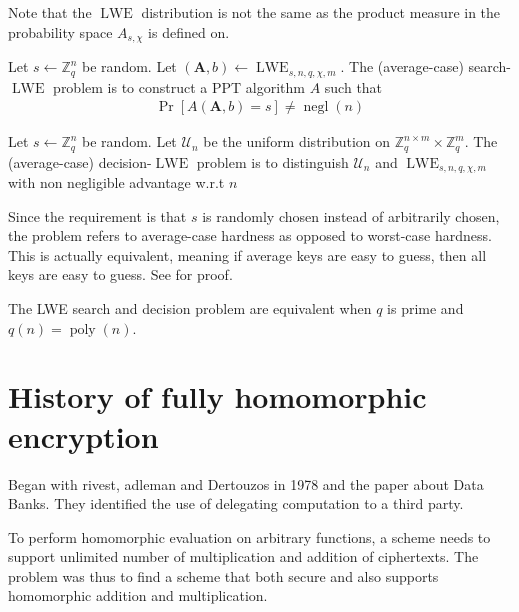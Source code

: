 Note that the $\operatorname{LWE}$ distribution is not the same as the product measure in the probability space $A_{s,\chi}$ is defined on.
\begin{definition}
    Let $s \leftarrow \mathbb{Z}_q^n$ be random.
    Let $(\textbf{A}, b) \leftarrow \operatorname{LWE}_{s, n, q, \chi, m}$. The (average-case) search-$\operatorname{LWE}$ problem is to construct a PPT algorithm $A$ such that
    \begin{equation}
        \begin{aligned}
            \operatorname{Pr}[A(\textbf{A}, b) = s] \neq \operatorname{negl}(n)
        \end{aligned}
    \end{equation}
\end{definition}
\begin{definition}
    Let $s \leftarrow \mathbb{Z}_q^n$ be random.
    Let $\mathcal{U}_n$ be the uniform distribution on $\mathbb{Z}_q^{n \times m} \times \mathbb{Z}_q^m$. The (average-case) decision-$\operatorname{LWE}$ problem is to distinguish $\mathcal{U}_n$ and $\operatorname{LWE}_{s, n, q, \chi, m}$ with non negligible advantage w.r.t $n$
\end{definition}
\begin{remark}
    Since the requirement is that $s$ is randomly chosen instead of arbitrarily chosen, the problem refers to average-case hardness as opposed to worst-case hardness. This is actually equivalent, meaning if average keys are easy to guess, then all keys are easy to guess. See \cite{Reg10} for proof.
\end{remark}
The LWE search and decision problem are equivalent when $q$ is prime and $q(n) = \operatorname{poly}(n)$.

\section{History of fully homomorphic encryption}
Began with rivest, adleman and Dertouzos in 1978 and the paper about Data Banks. 
They identified the use of delegating computation to a third party.

To perform homomorphic evaluation on arbitrary functions, a scheme needs to support unlimited number of multiplication and addition of ciphertexts. The problem was thus to find a scheme that both secure and also supports homomorphic addition and multiplication.

